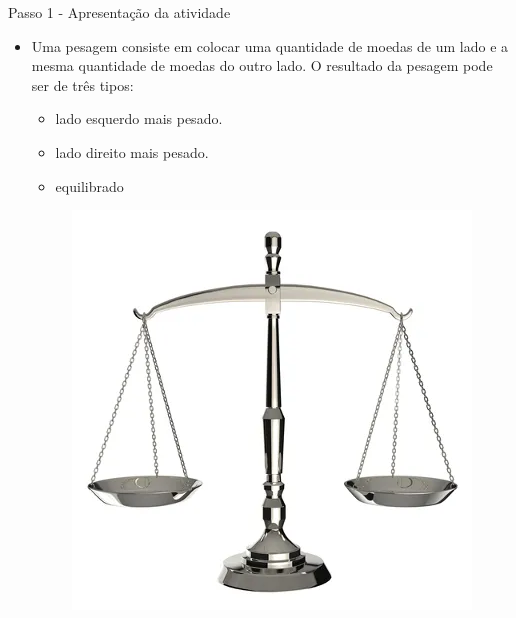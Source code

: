 \documentclass{beamer}
\begin{document}
\begin{frame}{Passo 1 - Apresentação da atividade}


\begin{itemize}
    \item Uma pesagem consiste em colocar uma quantidade de moedas de um lado e a mesma quantidade de moedas do outro lado. O resultado da pesagem pode ser de três tipos:
    \begin{itemize}
        \item lado esquerdo mais pesado.
        \item lado direito mais pesado.
        \item equilibrado
    \end{itemize}
    
    
    
\begin{figure}
\begin{center}
	\includegraphics[scale=0.3]{images/balanca.png} 
\end{center}
\end{figure}

 
    

\end{itemize}


\end{frame}


\end{document}
